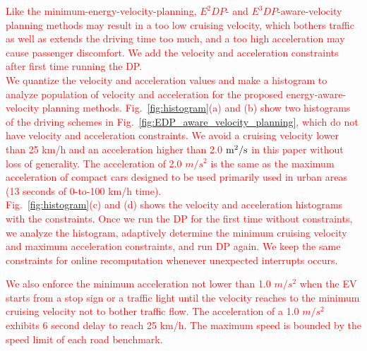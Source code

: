 \documentclass{IEEEtran}
\begin{document}
\textcolor{red}{Like the minimum-energy-velocity-planning, $E^2DP$- and $E^3DP$-aware-velocity planning methods may result in a too low cruising velocity, which bothers traffic as well as extends the driving time too much, and a too high acceleration may cause passenger discomfort. We add the velocity and acceleration constraints after first time running the DP. \\
We quantize the velocity and acceleration values and make a histogram to analyze population of velocity and acceleration for the proposed energy-aware-velocity planning methods. Fig.~\ref{fig:histogram}(a) and (b) show two histograms of the driving schemes in Fig.~\ref{fig:EDP_aware_velocity_planning}, which do not have velocity and acceleration constraints. We avoid a cruising velocity lower than 25 km/h and an acceleration higher than 2.0 $\rm{m^2}/s$ in this paper without loss of generality. The  acceleration of 2.0 $m/s^2$ is the same as the maximum acceleration of compact cars designed to be used primarily used in urban areas (13 seconds of 0-to-100 km/h time).\\
Fig.~\ref{fig:histogram}(c) and (d) shows the velocity and acceleration histograms with the constraints. Once we run the DP for the first time without constraints, we analyze the histogram, adaptively determine the minimum cruising velocity and maximum acceleration constraints, and run DP again. We keep the same constraints for online recomputation whenever unexpected interrupts occurs.} 

\textcolor{red}{We also enforce the minimum acceleration not lower than 1.0 $m/s^2$ when the EV starts from a stop sign or a traffic light until the velocity reaches to the minimum cruising velocity not to bother traffic flow. The acceleration of a 1.0 $m/s^2$ exhibits 6 second delay to reach 25 km/h. The maximum speed is bounded by the speed limit of each road benchmark.}
%
\end{document}
